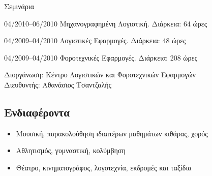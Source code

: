\documentclass[a4paper]{article}
\begin{document}
\begin{cv}{}
\begin{cvlist}{Σεμινάρια}
  \item[04/2010–06/2010] \textsf{Μηχανογραφημένη Λογιστική.}
                         Διάρκεια: 64 ώρες
  \item[04/2009–04/2010] \textsf{Λογιστικές Εφαρμογές.}
                         Διάρκεια: 48 ώρες
  \item[04/2009–04/2010] \textsf{Φοροτεχνικές Εφαρμογές.}
                         Διάρκεια: 208 ώρες
  \item[Διοργάνωση:] Κέντρο Λογιστικών και Φοροτεχνικών
                     Εφαρμογών \\
                     Διευθυντής: Αθανάσιος Τσαντζαλής
\end{cvlist}

\subsection*{Ενδιαφέροντα}
\begin{itemize}
  \item Μουσική, παρακολούθηση ιδιαιτέρων μαθημάτων κιθάρας,
        χορός
  \item Αθλητισμός, γυμναστική, κολύμβηση
  \item Θέατρο, κινηματογράφος, λογοτεχνία, εκδρομές και
        ταξίδια
\end{itemize}

\date{}

\end{cv}
\end{document}
